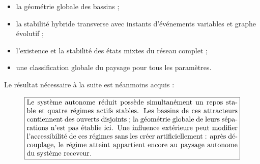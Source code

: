 \begin{itemize}
\item
  la géométrie globale des bassins ;
\item
  la stabilité hybride transverse avec instants d'événements
  variables et graphe évolutif ;
\item
  l'existence et la stabilité des états mixtes du réseau complet ;
\item
  une classification globale du paysage pour tous les paramètres.
\end{itemize}

Le résultat nécessaire à la suite est néanmoins acquis :

\[
\boxed{
\begin{minipage}{0.86\linewidth}
Le système autonome réduit possède simultanément un repos stable et quatre régimes actifs stables. Les bassins de ces attracteurs contiennent des ouverts disjoints ; la géométrie globale de leurs séparations n'est pas établie ici. Une influence extérieure peut modifier l'accessibilité de ces régimes sans les créer artificiellement : après découplage, le régime atteint appartient encore au paysage autonome du système receveur.
\end{minipage}
}
\]

